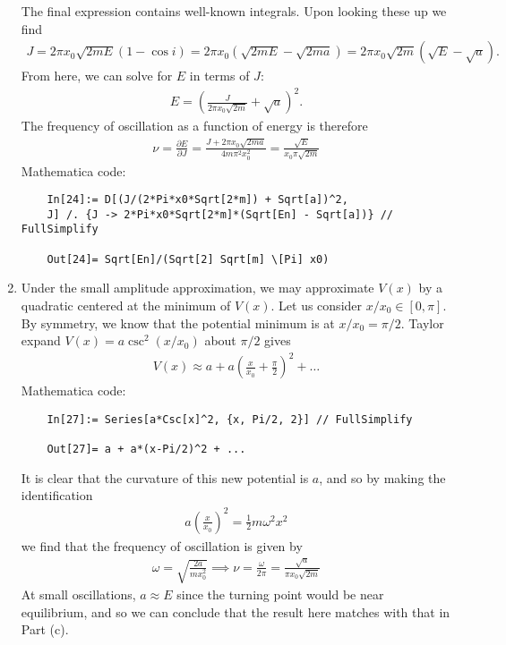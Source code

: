 \documentclass{article}
\theoremstyle{definition}
\newcommand{\p}{\partial}
\newcommand{\f}[2]{\frac{#1}{#2}}
\newcommand{\lp}{\left(}
\newcommand{\rp}{\right)}
\begin{document}
\begin{enumerate}[label=(\alph*)]
	The final expression contains well-known integrals. Upon looking these up we find 
	\begin{align*}
	J = 2\pi x_0 \sqrt{2mE} (1-\cos i ) = 2\pi x_0 (\sqrt{2mE} - \sqrt{2ma}) = 2\pi x_0 \sqrt{2m} (\sqrt{E} - \sqrt{a}).
	\end{align*}
	From here, we can solve for $E$ in terms of $J$:
	\begin{align*}
	E = \lp \f{J}{2\pi x_0\sqrt{2m}} + \sqrt{a} \rp^2.
	\end{align*}
	The frequency of oscillation as a function of energy is therefore
	\begin{align*}
	\boxed{\nu = \f{\p E}{\p J} = \f{J + 2\pi x_0\sqrt{2ma}}{4m\pi^2 x_0^2} = \f{\sqrt{E}}{x_0 \pi \sqrt{2m}}}
	\end{align*}
	Mathematica code:
	\begin{lstlisting}
	In[24]:= D[(J/(2*Pi*x0*Sqrt[2*m]) + Sqrt[a])^2, 
	J] /. {J -> 2*Pi*x0*Sqrt[2*m]*(Sqrt[En] - Sqrt[a])} // FullSimplify
	
	Out[24]= Sqrt[En]/(Sqrt[2] Sqrt[m] \[Pi] x0)
	\end{lstlisting}
	
	
	
	\item Under the small amplitude approximation, we may approximate $V(x)$ by a quadratic centered at the minimum of $V(x)$. Let us consider $x/x_0 \in [0,\pi]$. By symmetry, we know that the potential minimum is at $x/x_0 = \pi/2$. Taylor expand $V(x) = a\csc^2(x/x_0)$ about $\pi/2$ gives
	\begin{align*}
	V(x)\approx a + a\lp \f{x}{x_0} + \f{\pi}{2} \rp^2 + \dots
	\end{align*}
	Mathematica code:
	\begin{lstlisting}
	In[27]:= Series[a*Csc[x]^2, {x, Pi/2, 2}] // FullSimplify
	
	Out[27]= a + a*(x-Pi/2)^2 + ...
	\end{lstlisting}
	
	It is clear that the curvature of this new potential is $a$, and so by making the identification
	\begin{align*}
	a\lp \f{x}{x_0} \rp^2 = \f{1}{2}m\omega^2 x^2 
	\end{align*}
	we find that the frequency of oscillation is given by 
	\begin{align*}
	\boxed{\omega = \sqrt{\f{2a}{mx_0^2}} \implies \nu = \f{\omega}{2\pi} = \f{\sqrt{a}}{\pi x_0\sqrt{2m}}}
	\end{align*}
	At small oscillations, $a\approx E$ since the turning point would be near equilibrium, and so we can conclude that the result here matches with that in Part (c). 
	
\end{enumerate}
\end{document}
